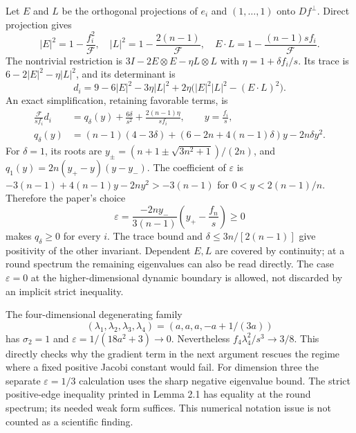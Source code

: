 \documentclass[10pt]{article}
\begin{document}
Let \(E\) and \(L\) be the orthogonal projections of \(e_i\) and \((1,\ldots,1)\) onto \(Df^\perp\). Direct projection gives \[|E|^2=1-\frac{f_i^2}{\mathcal F},\quad
 |L|^2=1-\frac{2(n-1)}{\mathcal F},\quad
 E\cdot L=1-\frac{(n-1)sf_i}{\mathcal F}.\] The nontrivial restriction is \(3I-2E\otimes E-\eta L\otimes L\) with \(\eta=1+\delta f_i/s\). Its trace is \(6-2|E|^2-\eta|L|^2\), and its determinant is \[d_i=9-6|E|^2-3\eta|L|^2
           +2\eta\bigl(|E|^2|L|^2-(E\cdot L)^2\bigr).\] An exact simplification, retaining favorable terms, is \[\begin{aligned}
 \frac{\mathcal F}{sf_i}d_i
 &=q_\delta(y)+\frac{6\delta}{s^2}
                   +\frac{2(n-1)\eta}{sf_i},\qquad y=\frac{f_i}{s},\\
 q_\delta(y)
 &=(n-1)(4-3\delta)
    +(6-2n+4(n-1)\delta)y-2n\delta y^2.\end{aligned}\] For \(\delta=1\), its roots are \(y_\pm=(n+1\pm\sqrt{3n^2+1})/(2n)\), and \(q_1(y)=2n(y_+-y)(y-y_-)\). The coefficient of \(\varepsilon\) is \(-3(n-1)+4(n-1)y-2ny^2>-3(n-1)\) for \(0<y<2(n-1)/n\). Therefore the paper’s choice \[\varepsilon=
 \frac{-2ny_-}{3(n-1)}
       \left(y_+-\frac{f_n}{s}\right)\ge0\] makes \(q_\delta\ge0\) for every \(i\). The trace bound and \(\delta\le3n/[2(n-1)]\) give positivity of the other invariant. Dependent \(E,L\) are covered by continuity; at a round spectrum the remaining eigenvalues can also be read directly. The case \(\varepsilon=0\) at the higher-dimensional dynamic boundary is allowed, not discarded by an implicit strict inequality.\par
The four-dimensional degenerating family \[(\lambda_1,\lambda_2,\lambda_3,\lambda_4)
       =(a,a,a,-a+1/(3a))\] has \(\sigma_2=1\) and \(\varepsilon=1/(18a^2+3)\to0\). Nevertheless \(f_4\lambda_4^2/s^3\to3/8\). This directly checks why the gradient term in the next argument rescues the regime where a fixed positive Jacobi constant would fail. For dimension three the separate \(\varepsilon=1/3\) calculation uses the sharp negative eigenvalue bound. The strict positive-edge inequality printed in Lemma 2.1 has equality at the round spectrum; its needed weak form suffices. This numerical notation issue is not counted as a scientific finding.\par
\end{document}
